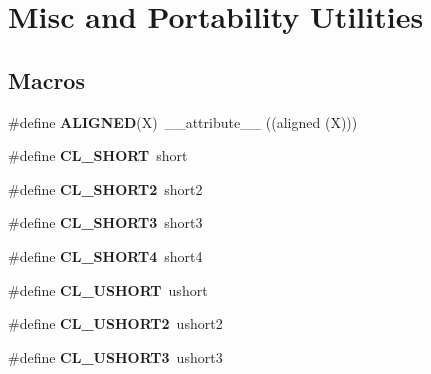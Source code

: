 \hypertarget{group__g15}{}\section{Misc and Portability Utilities}
\label{group__g15}
\subsection*{Macros}
\begin{DoxyCompactItemize}
\item 
\#define {\bfseries A\+L\+I\+G\+N\+ED}(X)~\+\_\+\+\_\+attribute\+\_\+\+\_\+ ((aligned (X)))\hypertarget{group__g15_ga9763e79ee25e85ca02c0d05e3aee7135}{}\label{group__g15_ga9763e79ee25e85ca02c0d05e3aee7135}

\item 
\#define {\bfseries C\+L\+\_\+\+S\+H\+O\+RT}~short\hypertarget{group__g15_ga2b10e6602244665f65bcd9ac7929e6a1}{}\label{group__g15_ga2b10e6602244665f65bcd9ac7929e6a1}

\item 
\#define {\bfseries C\+L\+\_\+\+S\+H\+O\+R\+T2}~short2\hypertarget{group__g15_ga98da83bd5d2af8c8dd55e6ac7c4fe67e}{}\label{group__g15_ga98da83bd5d2af8c8dd55e6ac7c4fe67e}

\item 
\#define {\bfseries C\+L\+\_\+\+S\+H\+O\+R\+T3}~short3\hypertarget{group__g15_ga1e38342799ca8dda31a55d13e7753024}{}\label{group__g15_ga1e38342799ca8dda31a55d13e7753024}

\item 
\#define {\bfseries C\+L\+\_\+\+S\+H\+O\+R\+T4}~short4\hypertarget{group__g15_ga6bd96771ac694434937d7a1b2f0d8ee6}{}\label{group__g15_ga6bd96771ac694434937d7a1b2f0d8ee6}

\item 
\#define {\bfseries C\+L\+\_\+\+U\+S\+H\+O\+RT}~ushort\hypertarget{group__g15_gaf0f34f0cc6f938111250b958a21cd942}{}\label{group__g15_gaf0f34f0cc6f938111250b958a21cd942}

\item 
\#define {\bfseries C\+L\+\_\+\+U\+S\+H\+O\+R\+T2}~ushort2\hypertarget{group__g15_ga491e875deac7b70f94efeef96ccd711e}{}\label{group__g15_ga491e875deac7b70f94efeef96ccd711e}

\item 
\#define {\bfseries C\+L\+\_\+\+U\+S\+H\+O\+R\+T3}~ushort3\hypertarget{group__g15_ga68d7075e81b537a88f81211bf675a975}{}\label{group__g15_ga68d7075e81b537a88f81211bf675a975}


\end{DoxyCompactItemize}
